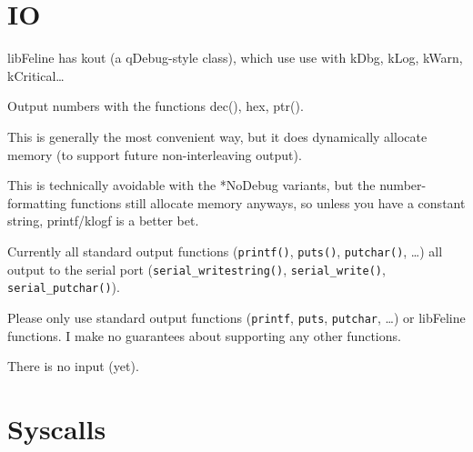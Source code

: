 \documentclass[12pt]{article}
\newcommand{\code}[1]{\colorbox{light-gray}{\texttt{#1}}}
\begin{document}
\section{IO}
\begin{list}{}{}
\item libFeline has kout (a qDebug-style class), which use use with kDbg, kLog, kWarn, kCritical…
\begin{list}{}{}
\item Output numbers with the functions dec(), hex, ptr().
\item This is generally the most convenient way, but it does dynamically allocate memory (to support future non-interleaving output).
\item This is technically avoidable with the *NoDebug variants, but the number-formatting functions still allocate memory anyways, so unless you have a constant string, printf/klogf is a better bet.
\end{list}
\item Currently all standard output functions (\code{printf()}, \code{puts()}, \code{putchar()}, \ldots) all output to the serial port (\code{serial\_writestring()}, \code{serial\_write()}, \code{serial\_putchar()}).\linebreak
\begin{list}{}{}
\item Please only use standard output functions (\code{printf}, \code{puts}, \code{putchar}, \ldots) or libFeline functions. I make no guarantees about supporting any other functions.
\end{list}
\item There is no input (yet).
\end{list}

\section{Syscalls}
\end{document}
